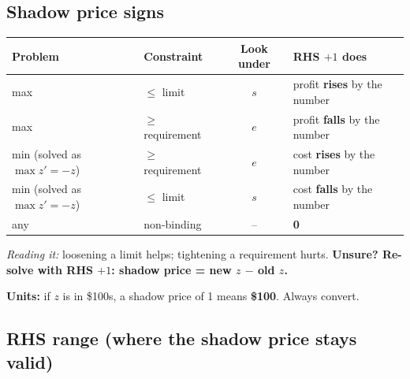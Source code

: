 \documentclass[10pt,a4paper]{article}
\newcommand{\reading}[1]{\textit{Reading it:} #1}
\newcommand{\thead}[1]{\textbf{#1}}
\newcommand{\Le}{\ensuremath{\leq}}
\newcommand{\Ge}{\ensuremath{\geq}}
\begin{document}
\subsection{Shadow price signs}

\begin{tabularx}{\linewidth}{@{}l l c L@{}}
\toprule
\thead{Problem} & \thead{Constraint} & \thead{Look under} & \thead{RHS $+1$ does} \\
\midrule
max & \Le{} limit & $s$ & profit \textbf{rises} by the number \\
max & \Ge{} requirement & $e$ & profit \textbf{falls} by the number \\
min (solved as $\max z' = -z$) & \Ge{} requirement & $e$ & cost \textbf{rises} by the number \\
min (solved as $\max z' = -z$) & \Le{} limit & $s$ & cost \textbf{falls} by the number \\
any & non-binding & -- & \textbf{0} \\
\bottomrule
\end{tabularx}

\reading{loosening a limit helps; tightening a requirement hurts. \textbf{Unsure? Re-solve with RHS $+1$: shadow price = new $z$ $-$ old $z$.}}

\textbf{Units:} if $z$ is in \$100s, a shadow price of 1 means \textbf{\$100}. Always convert.

\subsection{RHS range (where the shadow price stays valid)}
\end{document}
